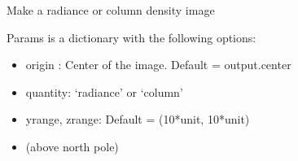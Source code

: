 \documentclass[letterpaper,10pt,english]{sphinxmanual}
\begin{document}
\begin{fulllineitems}
\begin{quote}
\begin{description}
\end{description}\end{quote}

\begin{fulllineitems}
\label{\detokenize{nexoclom2/nexoclom2.data_simulation.ModelImage:nexoclom2.data_simulation.ModelImage.ModelImage.__firstlineno__}}
\pysigstartsignatures
\pysigline
{}
\pysigstopsignatures
\end{fulllineitems}


\begin{fulllineitems}
\label{\detokenize{nexoclom2/nexoclom2.data_simulation.ModelImage:nexoclom2.data_simulation.ModelImage.ModelImage.__init__}}
\pysigstartsignatures
\pysiglinewithargsret
{}
{\sphinxparamcomma {}\sphinxparamcomma {}\sphinxparamcomma {}}
{}
\pysigstopsignatures
\sphinxAtStartPar
Make a radiance or column density image

\sphinxAtStartPar
Params is a dictionary with the following options:
\begin{itemize}
\item {} 
\sphinxAtStartPar
origin : Center of the image. Default = output.center

\item {} 
\sphinxAtStartPar
quantity: ‘radiance’ or ‘column’

\item {} 
\sphinxAtStartPar
yrange, zrange: Default = (\sphinxhyphen{}10*unit, 10*unit)

\item {} \begin{description}
\sphinxAtStartPar
(above north pole)

\end{description}


\end{itemize}
\end{fulllineitems}
\end{fulllineitems}
\end{document}
